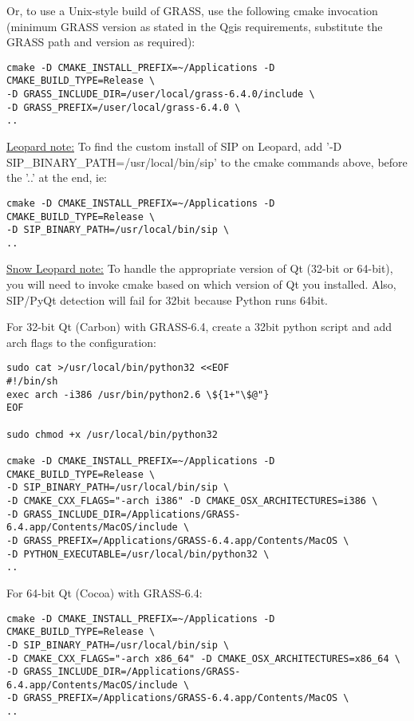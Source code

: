 Or, to use a Unix-style build of GRASS, use the following cmake invocation
(minimum GRASS version as stated in the Qgis requirements, substitute the GRASS
path and version as required):

\begin{verbatim}
cmake -D CMAKE_INSTALL_PREFIX=~/Applications -D CMAKE_BUILD_TYPE=Release \
-D GRASS_INCLUDE_DIR=/user/local/grass-6.4.0/include \
-D GRASS_PREFIX=/user/local/grass-6.4.0 \
..
\end{verbatim}

\underline{Leopard note:} To find the custom install of SIP on Leopard, add
'-D SIP\_BINARY\_PATH=/usr/local/bin/sip' to the cmake commands above,
before the '..' at the end, ie:

\begin{verbatim}
cmake -D CMAKE_INSTALL_PREFIX=~/Applications -D CMAKE_BUILD_TYPE=Release \
-D SIP_BINARY_PATH=/usr/local/bin/sip \
..
\end{verbatim}

\underline{Snow Leopard note:} To handle the appropriate version of Qt 
(32-bit or 64-bit), you will need to invoke cmake based on which version 
of Qt you installed.  Also, SIP/PyQt detection will fail for 32bit because 
Python runs 64bit.

For 32-bit Qt (Carbon) with GRASS-6.4, create a 32bit python script and add 
arch flags to the configuration:

\begin{verbatim}
sudo cat >/usr/local/bin/python32 <<EOF
#!/bin/sh
exec arch -i386 /usr/bin/python2.6 \${1+"\$@"}
EOF

sudo chmod +x /usr/local/bin/python32

cmake -D CMAKE_INSTALL_PREFIX=~/Applications -D CMAKE_BUILD_TYPE=Release \
-D SIP_BINARY_PATH=/usr/local/bin/sip \
-D CMAKE_CXX_FLAGS="-arch i386" -D CMAKE_OSX_ARCHITECTURES=i386 \
-D GRASS_INCLUDE_DIR=/Applications/GRASS-6.4.app/Contents/MacOS/include \
-D GRASS_PREFIX=/Applications/GRASS-6.4.app/Contents/MacOS \
-D PYTHON_EXECUTABLE=/usr/local/bin/python32 \
..
\end{verbatim}

For 64-bit Qt (Cocoa) with GRASS-6.4:

\begin{verbatim}
cmake -D CMAKE_INSTALL_PREFIX=~/Applications -D CMAKE_BUILD_TYPE=Release \
-D SIP_BINARY_PATH=/usr/local/bin/sip \
-D CMAKE_CXX_FLAGS="-arch x86_64" -D CMAKE_OSX_ARCHITECTURES=x86_64 \
-D GRASS_INCLUDE_DIR=/Applications/GRASS-6.4.app/Contents/MacOS/include \
-D GRASS_PREFIX=/Applications/GRASS-6.4.app/Contents/MacOS \
..
\end{verbatim}

